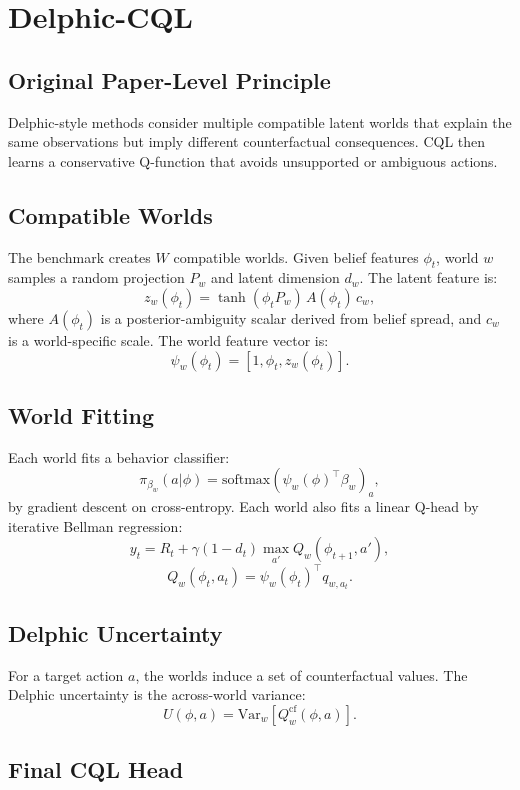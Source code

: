 \documentclass[11pt]{article}
\newcommand{\Var}{\mathrm{Var}}
\newcommand{\1}{\mathbf{1}}
\begin{document}
\section{Delphic-CQL}

\subsection{Original Paper-Level Principle}

Delphic-style methods consider multiple compatible latent worlds that explain
the same observations but imply different counterfactual consequences.  CQL
then learns a conservative Q-function that avoids unsupported or ambiguous
actions.

\subsection{Compatible Worlds}

The benchmark creates $W$ compatible worlds.  Given belief features $\phi_t$,
world $w$ samples a random projection $P_w$ and latent dimension $d_w$.  The
latent feature is:
\[
  z_w(\phi_t)
  =
  \tanh(\phi_tP_w)\,
  A(\phi_t)\,
  c_w,
\]
where $A(\phi_t)$ is a posterior-ambiguity scalar derived from belief spread,
and $c_w$ is a world-specific scale.  The world feature vector is:
\[
  \psi_w(\phi_t)=
  [1,\phi_t,z_w(\phi_t)].
\]

\subsection{World Fitting}

Each world fits a behavior classifier:
\[
  \pi_{\beta_w}(a|\phi)
  =
  \mathrm{softmax}(\psi_w(\phi)^\top\beta_w)_a,
\]
by gradient descent on cross-entropy.  Each world also fits a linear Q-head by
iterative Bellman regression:
\[
  y_t = R_t+\gamma(1-d_t)\max_{a'}Q_w(\phi_{t+1},a'),
\]
\[
  Q_w(\phi_t,a_t)=\psi_w(\phi_t)^\top q_{w,a_t}.
\]

\subsection{Delphic Uncertainty}

For a target action $a$, the worlds induce a set of counterfactual values.  The
Delphic uncertainty is the across-world variance:
\[
  U(\phi,a)=\Var_w[Q_w^{\mathrm{cf}}(\phi,a)].
\]

\subsection{Final CQL Head}
\end{document}
